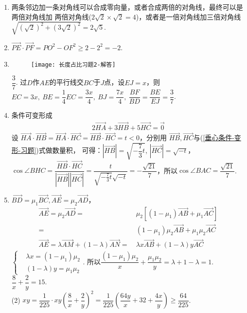 \begin{enumerate}[label={\textbf{\arabic*.}},leftmargin=
    \inteval{\myenumleftmargin}pt]
\item 
两条邻边加一条对角线可以合成零向量，或者合成两倍的对角线，最终可以是两倍对角线加
两倍对角线($ 2\sqrt{2}\times \sqrt{2} =4 $)，或者是一倍对角线加三倍对角线\\
$ \sqrt{(\sqrt{2})^2+(3\sqrt{2})^2}=2\sqrt{5} $. 

\item $ \vec{PE}\cdot \vec{PF}=PO^2-OF^2 \geq 2-2^2=-2 $. 

\item 
\begin{figure}[h]
    \centering
    \texttt{[image: 长度占比习题2-解答]}
\end{figure}
$ \dfrac{3}{7} $. 过$ D $作$ AE $的平行线交$ BC $于$ J $点，设$ EJ=x $，则$ EC=3x,\ BE=\dfrac{1}{4}EC=\dfrac{3x}{4},\ BJ=\dfrac{7x}{4},\ \dfrac{BF}{BD}=\dfrac{BE}{EJ}=\dfrac{3}{7} $. 

\item 条件可变形成
\begin{align}\label{垂心条件-变形-习题}
    2\vec{HA}+
    3\vec{HB} +5\vec{HC}=\vec{0}
\end{align}
设 $ \vec{HA}\cdot \vec{HB}=\vec{HA}
\cdot\vec{HC}=\vec{HB}\cdot \vec{HC}=t<0 $，分别用
$ \vec{HB},\vec{HC} $与(\ref{垂心条件-变形-习题})式做数量积，
可得：$ |\vec{HB}|=\sqrt{-\dfrac{7}{3}t} $, $ |\vec{HC}|=\sqrt{-t} $，
$ \cos\angle BHC=\dfrac{\vec{HB}\cdot \vec{HC}}
{|\vec{HB}||\vec{HC}|}=\dfrac{t}{\sqrt{-\frac{7}{3}t}\sqrt{-t}}
=-\dfrac{\sqrt{21}}{7} $，所以$ \cos \angle BAC=\dfrac{\sqrt{21}}{7} $.

\item 
$ \vec{BD}=\mu_1\vec{BC}, \vec{AE} =
\mu_2\vec{AD} $，
\begin{align*}
    \vec{AE} =\mu_2\vec{AD} =&\ \mu_2\left[
    (1-\mu_1)\vec{AB}+\mu_1\vec{AC}\right]\\
    =&\ (1-\mu_1)\mu_2\vec{AB}+\mu_1\mu_2\vec{AC} \\
    \vec{AE}=\lambda\vec{AM}+(1-\lambda)
    \vec{AN}=&\ \lambda x\vec{AB}+(1-\lambda)y
    \vec{AC}
\end{align*}
$ \left\{ 
\begin{aligned}
    &\lambda x = (1-\mu_1)\mu_2 \\
    &(1-\lambda)y = \mu_1\mu_2
\end{aligned} \right. $. 所以$ \dfrac{(1-\mu_1)\mu_2}{x}+\dfrac{\mu_1\mu_2}{y}
=\lambda+1-\lambda=1 $.  \quad $ \dfrac{8}{x}+\dfrac{2}{y}=15 $. \\
(2) $ xy=\dfrac{1}{225}\cdot xy \left(\dfrac{8}{x}+\dfrac{2}{y}\right)^2=
\dfrac{1}{225}\left(\dfrac{64y}{x}+32+\dfrac{4x}{y}\right)\geq\dfrac{64}{225} $. 


\end{enumerate}
